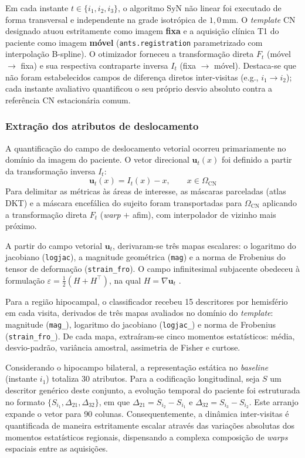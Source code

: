 \documentclass[review]{elsarticle}
\newcommand{\code}[1]{\texttt{#1}}
\begin{document}
	Em cada instante $t \in \{i_1, i_2, i_3\}$, o algoritmo SyN não linear \cite{avants-2011a} foi executado de forma transversal e independente na grade isotrópica de $1{,}0$\,mm. O \emph{template} CN designado atuou estritamente como imagem \textbf{fixa} e a aquisição clínica T1 do paciente como imagem \textbf{móvel} (\code{ants.registration} parametrizado com interpolação B-spline). O otimizador forneceu a transformação direta $F_t$ (móvel $\to$ fixa) e sua respectiva contraparte inversa $I_t$ (fixa $\to$ móvel). Destaca-se que não foram estabelecidos campos de diferença diretos inter-visitas (e.g., $i_1 \to i_2$); cada instante avaliativo quantificou o seu próprio desvio absoluto contra a referência CN estacionária comum.
	
	\subsubsection{Extração dos atributos de deslocamento}\label{sec:displacement-features}
	A quantificação do campo de deslocamento vetorial ocorreu primariamente no domínio da imagem do paciente. O vetor direcional $\mathbf{u}_t(x)$ foi definido a partir da transformação inversa $I_t$:
	$$ \mathbf{u}_t(x) = I_t(x) - x, \qquad x \in \Omega_{\mathrm{CN}} $$
	Para delimitar as métricas às áreas de interesse, as máscaras parceladas (atlas DKT) e a máscara encefálica do sujeito foram transportadas para $\Omega_{\mathrm{CN}}$ aplicando a transformação direta $F_t$ (\emph{warp} $+$ afim), com interpolador de vizinho mais próximo.
	
	A partir do campo vetorial $\mathbf{u}_t$, derivaram-se três mapas escalares: o logaritmo do jacobiano (\code{logjac}), a magnitude geométrica (\code{mag}) e a norma de Frobenius do tensor de deformação (\code{strain\_fro}). O campo infinitesimal subjacente obedeceu à formulação $\varepsilon = \frac{1}{2}(H+H^{\top})$, na qual $H = \nabla\mathbf{u}_t$ \citep{bouke-2023}.
	
	Para a região hipocampal, o classificador recebeu 15 descritores por hemisfério em cada visita, derivados de três mapas avaliados no domínio do \emph{template}: magnitude (\code{mag\_}), logaritmo do jacobiano (\code{logjac\_}) e norma de Frobenius (\code{strain\_fro\_}). De cada mapa, extraíram-se cinco momentos estatísticos: média, desvio-padrão, variância amostral, assimetria de Fisher e curtose.
	
	Considerando o hipocampo bilateral, a representação estática no \emph{baseline} (instante $i_1$) totaliza 30 atributos. Para a codificação longitudinal, seja $S$ um descritor genérico deste conjunto, a evolução temporal do paciente foi estruturada no formato $\{S_{i_1}, \Delta_{21}, \Delta_{32}\}$, em que $\Delta_{21} = S_{i_2} - S_{i_1}$ e $\Delta_{32} = S_{i_3} - S_{i_2}$. Este arranjo expande o vetor para 90 colunas. Consequentemente, a dinâmica inter-visitas é quantificada de maneira estritamente escalar através das variações absolutas dos momentos estatísticos regionais, dispensando a complexa composição de \emph{warps} espaciais entre as aquisições.
	
\end{document}
